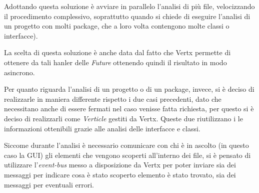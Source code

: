  Adottando questa soluzione è avviare in parallelo l'analisi di più file, velocizzando il procedimento complessivo, soprattutto quando si chiede di eseguire l'analisi di un progetto con molti package, che a loro volta contengono molte classi o interfacce).\redCor{$\Leftarrow{}$}

La scelta di questa soluzione è anche data dal fatto che Vertx permette di ottenere da tali hanler delle \textit{Future} ottenendo quindi il risultato in modo asincrono.%

Per quanto riguarda l'analisi di un progetto o di un package, invece, si è deciso di realizzarle in maniera differente rispetto i due casi precedenti, dato che necessitano anche di essere fermati nel caso venisse fatta richiesta, per questo si è deciso di realizzarli come \textit{Verticle} gestiti da Vertx. Queste due riutilizzano i le informazioni ottenibili grazie alle analisi delle interfacce e classi.
%
%

Siccome durante l'analisi è necessario comunicare con chi è in ascolto (in questo caso la GUI) gli elementi che vengono scoperti all'interno dei file, si è pensato di utilizzare l'\textit{event-bus} messo a disposizione da Vertx per poter inviare sia dei messaggi per indicare cosa è stato scoperto elemento è stato trovato, sia dei messaggi per eventuali errori. 
%

